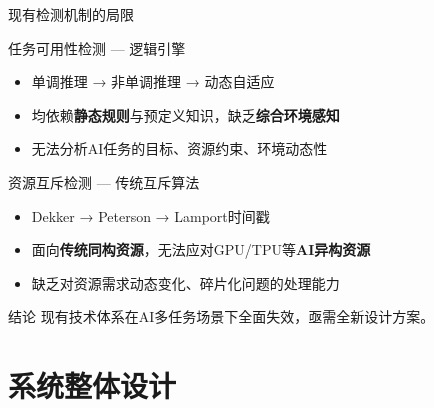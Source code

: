 \documentclass[aspectratio=169,UTF8,xcolor=table]{ctexbeamer}
\begin{document}
\begin{frame}{现有检测机制的局限}
  \begin{block}{任务可用性检测 — 逻辑引擎}
    \begin{itemize}
      \item 单调推理 → 非单调推理 → 动态自适应
      \item 均依赖\textbf{静态规则}与预定义知识，缺乏\textbf{综合环境感知}
      \item 无法分析AI任务的目标、资源约束、环境动态性
    \end{itemize}
  \end{block}

  \begin{block}{资源互斥检测 — 传统互斥算法}
    \begin{itemize}
      \item Dekker → Peterson → Lamport时间戳
      \item 面向\textbf{传统同构资源}，无法应对GPU/TPU等\textbf{AI异构资源}
      \item 缺乏对资源需求动态变化、碎片化问题的处理能力
    \end{itemize}
  \end{block}

  \begin{exampleblock}{结论}
    现有技术体系在AI多任务场景下全面失效，亟需全新设计方案。
  \end{exampleblock}
\end{frame}

\section{系统整体设计}
\end{document}
